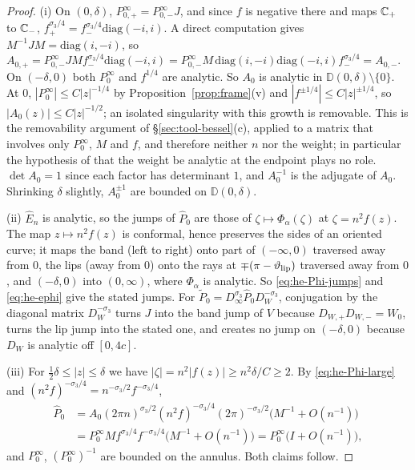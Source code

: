 \begin{proof}
(i) On $(0,\delta)$, $P^\infty_{0,+}=P^\infty_{0,-}J$, and since $f$ is negative there and maps $\mathbb{C}_+$ to $\mathbb{C}_-$,
$f_+^{\sigma_3/4}=f_-^{\sigma_3/4}\mathrm{diag}(-i,i)$. A direct computation gives $M^{-1}JM=\mathrm{diag}(i,-i)$, so
$A_{0,+}=P^\infty_{0,-}JMf_-^{\sigma_3/4}\mathrm{diag}(-i,i)=P^\infty_{0,-}M\,\mathrm{diag}(i,-i)\mathrm{diag}(-i,i)f_-^{\sigma_3/4}
=A_{0,-}$. On $(-\delta,0)$ both $P^\infty_0$ and $f^{1/4}$ are analytic. So $A_0$ is analytic in $\mathbb D(0,\delta)\setminus\{0\}$.
At $0$, $|P^\infty_0|\le C|z|^{-1/4}$ by Proposition~\ref{prop:frame}(v) and $|f^{\pm1/4}|\le C|z|^{\pm1/4}$, so $|A_0(z)|\le C|z|^{-1/2}$; an isolated
singularity with this growth is removable. This is the removability argument of \S\ref{sec:tool-bessel}(c), applied to a matrix
that involves only $P^\infty_0$, $M$ and $f$, and therefore neither $n$ nor the weight; in particular the hypothesis of
\cite{KMVV} that the weight be analytic at the endpoint plays no role. $\det A_0=1$ since each factor has determinant
$1$, and $A_0^{-1}$ is the adjugate of $A_0$. Shrinking $\delta$ slightly, $A_0^{\pm1}$ are bounded on $\mathbb D(0,\delta)$.

(ii) $\hat E_n$ is analytic, so the jumps of $\hat P_0$ are those of $\zeta\mapsto\Phi_\alpha(\zeta)$ at $\zeta=n^2f(z)$. The
map $z\mapsto n^2f(z)$ is conformal, hence preserves the sides of an oriented curve; it maps the band (left to right)
onto part of $(-\infty,0)$ traversed away from $0$, the lips (away from $0$) onto the rays at $\mp(\pi-\vartheta_{\mathrm{lip}})$
traversed away from $0$, and $(-\delta,0)$ into $(0,\infty)$, where $\Phi_\alpha$ is analytic. So
\eqref{eq:he-Phi-jumps} and \eqref{eq:he-ephi} give the stated jumps. For $\tilde P_0=D_\infty^{\sigma_3}\hat P_0
D_W^{-\sigma_3}$, conjugation by the diagonal matrix $D_W^{-\sigma_3}$ turns $J$ into the band jump of $V$ because
$D_{W,+}D_{W,-}=W_0$, turns the lip jump into the stated one, and creates no jump on $(-\delta,0)$ because $D_W$ is
analytic off $[0,4c]$.

(iii) For $\frac12\delta\le|z|\le\delta$ we have $|\zeta|=n^2|f(z)|\ge n^2\delta/C\ge2$. By \eqref{eq:he-Phi-large} and
$(n^2f)^{-\sigma_3/4}=n^{-\sigma_3/2}f^{-\sigma_3/4}$,
\begin{align*}
  \hat P_0&=A_0(2\pi n)^{\sigma_3/2}(n^2f)^{-\sigma_3/4}(2\pi)^{-\sigma_3/2}\bigl(M^{-1}+O(n^{-1})\bigr)\\
  &=P^\infty_0 Mf^{\sigma_3/4}f^{-\sigma_3/4}\bigl(M^{-1}+O(n^{-1})\bigr)=P^\infty_0\bigl(I+O(n^{-1})\bigr),
\end{align*}
and $P^\infty_0$, $(P^\infty_0)^{-1}$ are bounded on the annulus. Both claims follow.
\end{proof}

